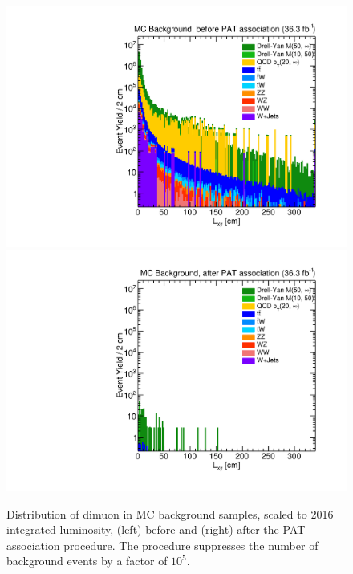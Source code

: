 \begin{figure}[p]
  \centering
  \includegraphics[width=\DSquareWidth]{figures/displaced/REPEFF_MC_Lxy-before.pdf}
  \hspace*{-2em}
  \includegraphics[width=\DSquareWidth]{figures/displaced/REPEFF_MC_Lxy-after.pdf}
  \caption{Distribution of dimuon \Lxy in MC background samples, scaled to 2016 integrated luminosity, (left) before and (right) after the PAT association procedure. The procedure suppresses the number of background events by a factor of $10^5$.}
  \label{fig:dd:REPEFF_MC_Lxy}
\end{figure}

